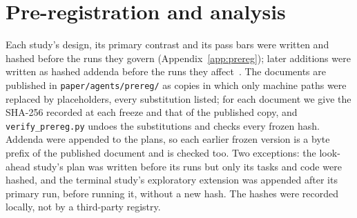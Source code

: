 \documentclass[11pt]{article}
\begin{document}
\section{Pre-registration and analysis}\label{sec:prereg}
Each study's design, its primary contrast and its pass bars were written and hashed before the runs they govern
(Appendix~\ref{app:prereg}); later additions were written as hashed addenda before the runs they affect~\cite{nosek2018}.
The documents are published in \texttt{paper/agents/prereg/} as copies in which only machine paths were replaced by
placeholders, every substitution listed; for each document we give the SHA-256 recorded at each freeze and that of the
published copy, and \texttt{verify\_prereg.py} undoes the substitutions and checks every frozen hash. Addenda were
appended to the plans, so each earlier frozen version is a byte prefix of the published document and is checked too.
Two exceptions: the look-ahead study's plan was written before its runs but only its tasks and code were hashed, and the
terminal study's exploratory extension was appended after its primary run, before running it, without a new hash. The
hashes were recorded locally, not by a third-party registry.
\end{document}
